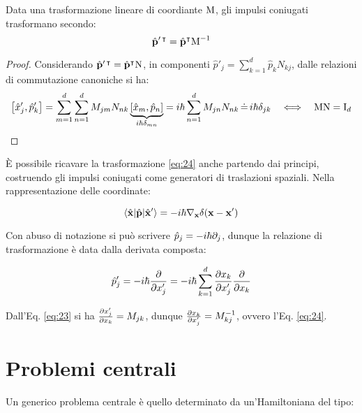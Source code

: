 \begin{proposition}
	Data una trasformazione lineare di coordiante $ \mathbf{\text{M}} $, gli impulsi coniugati trasformano secondo:
	\begin{equation}
		\hat{\mathbf{p}}'^{\,\intercal} = \hat{\mathbf{p}}^{\intercal} \mathbf{\text{M}}^{-1}
		\label{eq:24}
	\end{equation}
\end{proposition}
\begin{proof}
	Considerando $ \hat{\mathbf{p}}'^{\,\intercal} = \hat{\mathbf{p}}^{\intercal} \mathbf{\text{N}} $, in componenti $ \hat{p}'_j = \sum_{k = 1}^{d} \hat{p}_k N_{kj} $, dalle relazioni di commutazione canoniche si ha:
	\begin{equation*}
		\left[\hat{x}'_j, \hat{p}'_k\right] = \sum_{m = 1}^{d} \sum_{n = 1}^{d} M_{jm} N_{nk} \underbrace{\left[\hat{x}_m, \hat{p}_n\right]}_{i \hbar \delta_{mn}} = i\hbar \sum_{n = 1}^{d} M_{jn} N_{nk} \,\dot{=}\, i\hbar \delta_{jk} \quad \Longleftrightarrow \quad \mathbf{\text{M}}\mathbf{\text{N}} = \mathbf{\text{I}}_d
	\end{equation*}
\end{proof}

È possibile ricavare la trasformazione \ref{eq:24} anche partendo dai principi, costruendo gli impulsi coniugati come generatori di traslazioni spaziali. Nella rappresentazione delle coordinate:

\begin{equation}
	\braket{\hat{\mathbf{x}} | \hat{\mathbf{p}} | \hat{\mathbf{x}}'} = - i\hbar \nabla_{\mathbf{x}}\delta(\mathbf{x} - \mathbf{x}')
	\label{eq:25}
\end{equation}

Con abuso di notazione si può scrivere $ \hat{p}_j = -i\hbar\partial_j $, dunque la relazione di trasformazione è data dalla derivata composta:

\begin{equation}
	\hat{p}'_j = -i\hbar \frac{\partial }{\partial x'_j} = -i\hbar \displaystyle\sum_{k = 1}^{d} \frac{\partial x_k}{\partial x'_j} \frac{\partial}{\partial x_k}
	\label{eq:26}
\end{equation}

Dall'Eq. \ref{eq:23} si ha $ \frac{\partial x'_j}{\partial x_k} = M_{jk} $, dunque $ \frac{\partial x_k}{\partial x'_j} = M^{-1}_{kj} $, ovvero l'Eq. \ref{eq:24}.

\section{Problemi centrali}

Un generico problema centrale è quello determinato da un'Hamiltoniana del tipo:

